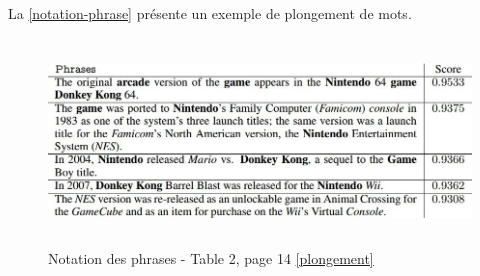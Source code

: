         La \autoref{notation-phrase} présente un exemple de plongement de mots.
            \begin{figure}[H]
                \centering
                \includegraphics[height=155pt,width=400pt]{img/chapter3/scoreembed.jpg}
                \caption{Notation des phrases - Table 2, page 14 \ref{plongement}}
                \label{notation-phrase}
            \end{figure}

